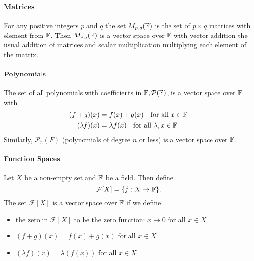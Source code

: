 \paragraph{Matrices}
For any positive integers \(p\) and \(q\) the set \(M_{p,q}(\mathbb{F})\) is the set of \(p \times q\) matrices with element from \(\mathbb{F}\). Then \(M_{p,q}(\mathbb{F})\) is a vector space over \(\mathbb{F}\) with vector addition the usual addition of matrices and scalar multiplication multiplying each element of the matrix.

\paragraph{Polynomials}
The set of all polynomials with coefficients in \(\mathbb{F}, \mathcal{P}(\mathbb{F})\), is a vector space over \(\mathbb{F}\) with 
\begin{align*}
(f+g)(x) & = f(x) + g(x) \quad \text{for all } x \in \mathbb{F} \\
(\lambda f)(x) & = \lambda f(x) \quad \text{for all } \lambda, x \in \mathbb{F}
\end{align*}
Similarly, \(\mathcal{P}_n(F)\) (polynomials of degree \(n\) or less) is a vector space over \(\mathbb{F}\).

\paragraph{Function Spaces}
Let \(X\) be a non-empty set and \(\mathbb{F}\) be a field. Then define
\[\mathcal{F}[X] = \{ f: X \to \mathbb{F} \}.\]
The set \(\mathcal{F}[X]\) is a vector space over \(\mathbb{F}\) if we define
\begin{itemize}
    \item the zero in \(\mathcal{F}[X]\) to be the zero function: \(x \to 0\) for all \(x \in X\)
    \item \((f + g)(x) = f(x) + g(x)\) for all \(x \in X\)
    \item \((\lambda f)(x) = \lambda(f(x))\) for all \(x \in X\)
\end{itemize}
